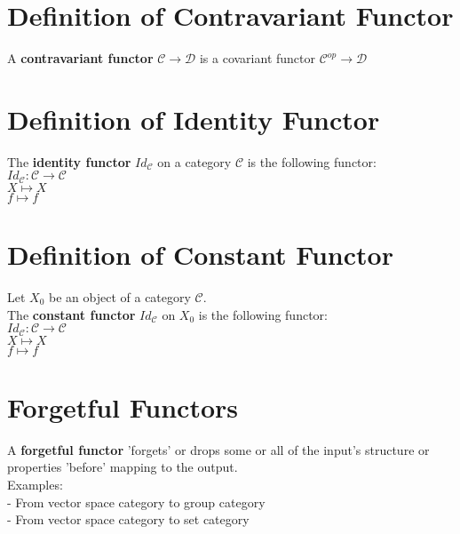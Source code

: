 \documentclass[a4paper, twoside, english, 11pt]{book}
\newcommand{\C}{\mathcal C}
\newcommand{\D}{\mathcal D}
\begin{document}
\section{Definition of Contravariant Functor}

A \textbf{contravariant functor} $\C \rightarrow \D$ is a covariant functor $\C^{op} \rightarrow \D$



\section{Definition of Identity Functor}

The \textbf{identity functor} $Id_\C$ on a category $\C$ is the following functor: \\

$Id_\C : \C \rightarrow \C$\\
\indent
$X \mapsto X$ \\
\indent
$f \mapsto f$



\section{Definition of Constant Functor}

Let $X_0$ be an object of a category $\C$. \\
The \textbf{constant functor} $Id_\C$ on $X_0$ is the following functor: \\

$Id_\C : \C \rightarrow \C$\\
\indent
$X \mapsto X$ \\
\indent
$f \mapsto f$



\section{Forgetful Functors}

A \textbf{forgetful functor} 'forgets' or drops some or all of the input's structure or properties 'before' mapping to the output. \\

\noindent
Examples: \\

- From vector space category to group category \\

- From vector space category to set category \\
\end{document}

